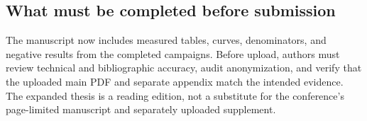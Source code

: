 \subsection{What must be completed before submission}
The manuscript now includes measured tables, curves, denominators, and
negative results from the completed campaigns. Before upload, authors must
review technical and bibliographic accuracy, audit anonymization, and verify
that the uploaded main PDF and separate appendix match the intended evidence.
The expanded thesis
is a reading edition, not a substitute for the conference's page-limited
manuscript and separately uploaded supplement.
